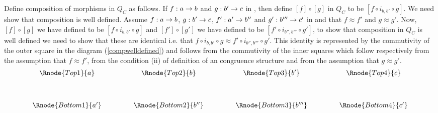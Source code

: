 \documentclass[10pt,a4paper]{article}
\theoremstyle{remark}
\begin{document}
Define composition of morphisms in $Q_C$ as follows.  If
 $f:a \rightarrow b$ and $g: b' \rightarrow c$ in \catcw, then define $[f] \circ [g]$ in $Q_C$ to be $[f \circ i_{b,b'} \circ g]$.
We need show that composition is well defined.  Assume $f:a \rightarrow b$, $g: b' \rightarrow c$, $f':a' \rightarrow b''$ and $g': b''' \rightarrow c'$ in \catcw and that
$f \approx f'$ and $g \approx g'$.
Now,  
$[f] \circ [g]$ we have defined to be $[f \circ i_{b,b'} \circ g]$  and $[f']  \circ [g']$ we have defined to be $[f' \circ i_{b'',b'''} \circ g']$,
to show that composition in $Q_C$ is well defined we need to show that these are identical i.e. that $f \circ i_{b,b'} \circ g \approx f' \circ i_{b'',b'''} \circ g'$. This identity
is represented by the commutivity of the outer square in the diagram (\ref{compwelldefined}) and follows from the commutivity of the inner squares which follow respectively from the assumption that $f \approx f'$,
from the condition (ii) of definition of an congruence structure and from the assumption that $g \approx g'$.
\begin{equation}
\label{compwelldefined}
\begin{array}{cp{.9cm}cp{.9cm}cp{.9cm}c}
\Rnode{Top1}{a} & & \Rnode{Top2}{b}  & & \Rnode{Top3}{b'} && \Rnode{Top4}{c}\\ [1.2cm]
\Rnode{Bottom1}{a'} & & \Rnode{Bottom2}{b''}  & & \Rnode{Bottom3}{b'''} && \Rnode{Bottom4}{c'}
\end{array}
\end{equation}
\end{document}
